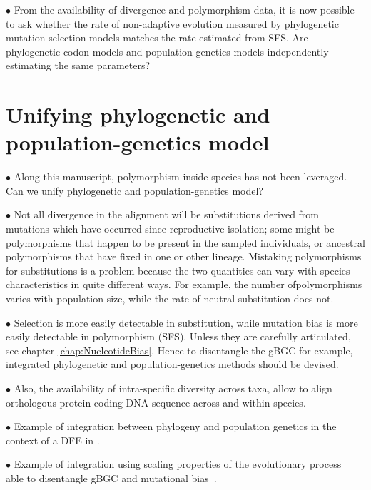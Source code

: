 $\bullet$ From the availability of divergence and polymorphism data, it is now possible to ask whether the rate of non-adaptive evolution measured by phylogenetic mutation-selection models matches the rate estimated from \acrshort{SFS}.
Are phylogenetic \gls{codon} models and population-genetics models independently estimating the same parameters?

\section{Unifying phylogenetic and population-genetics model}
\label{sec:unifying-phylogenetic-and-population-genetics-model}

$\bullet$ Along this manuscript, polymorphism inside species has not been leveraged. Can we unify phylogenetic and population-genetics model?

$\bullet$ Not all divergence in the alignment will be substitutions derived from mutations which have occurred since reproductive isolation; some might be polymorphisms that happen to be present in the sampled individuals, or ancestral polymorphisms that have fixed in one or other lineage. Mistaking polymorphisms for substitutions is a problem because the two quantities can vary with species characteristics in quite different ways. For example, the number ofpolymorphisms varies with population size, while the rate of neutral substitution does not. 

$\bullet$ Selection is more easily detectable in \gls{substitution}, while mutation bias is more easily detectable in polymorphism (\acrshort{SFS}).
Unless they are carefully articulated, see chapter \ref{chap:NucleotideBias}.
Hence to disentangle the gBGC for example, integrated phylogenetic and population-genetics methods should be devised.

$\bullet$ Also, the availability of intra-specific diversity across taxa, allow to align orthologous protein coding \acrshort{DNA} sequence across and within species.

$\bullet$ Example of integration between phylogeny and population genetics in the context of a \acrshort{DFE} in \citet{Wilson2011}.

$\bullet$ Example of integration using scaling properties of the evolutionary process~\citep{DeMaio2013, Schrempf2016, Bergman2018, Schrempf2019} able to disentangle gBGC and mutational bias~\citep{Borges2019, Borges2020}.

